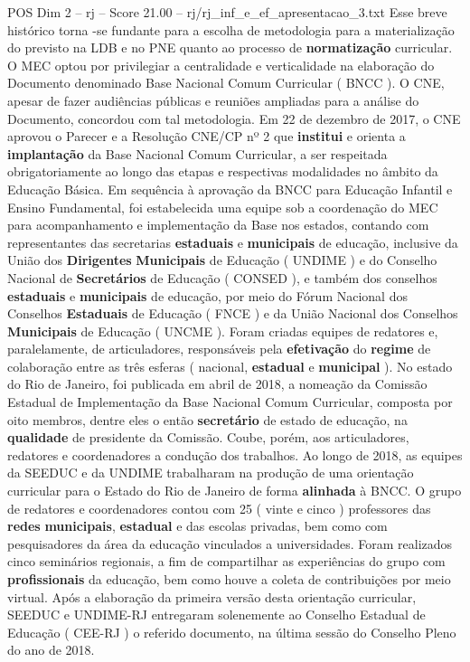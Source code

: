 \begin{textsample}{POS Dim 2 – rj – Score 21.00 – rj/rj\_inf\_e\_ef\_apresentacao\_3.txt}
Esse breve histórico torna -se fundante para a escolha de metodologia para a materialização do previsto na LDB e no PNE quanto ao processo de \textbf{normatização} curricular.
O MEC optou por privilegiar a centralidade e verticalidade na elaboração do Documento denominado Base Nacional Comum Curricular ( BNCC ).
O CNE, apesar de fazer audiências públicas e reuniões ampliadas para a análise do Documento, concordou com tal metodologia.
Em 22 de dezembro de 2017, o CNE aprovou o Parecer e a Resolução CNE/CP nº 2 que \textbf{institui} e orienta a \textbf{implantação} da Base Nacional Comum Curricular, a ser respeitada obrigatoriamente ao longo das etapas e respectivas modalidades no âmbito da Educação Básica.
Em sequência à aprovação da BNCC para Educação Infantil e Ensino Fundamental, foi estabelecida uma equipe sob a coordenação do MEC para acompanhamento e implementação da Base nos estados, contando com representantes das secretarias \textbf{estaduais} e \textbf{municipais} de educação, inclusive da União dos \textbf{Dirigentes} \textbf{Municipais} de Educação ( UNDIME ) e do Conselho Nacional de \textbf{Secretários} de Educação ( CONSED ), e também dos conselhos \textbf{estaduais} e \textbf{municipais} de educação, por meio do Fórum Nacional dos Conselhos \textbf{Estaduais} de Educação ( FNCE ) e da União Nacional dos Conselhos \textbf{Municipais} de Educação ( UNCME ).
Foram criadas equipes de redatores e, paralelamente, de articuladores, responsáveis pela \textbf{efetivação} do \textbf{regime} de colaboração entre as três esferas ( nacional, \textbf{estadual} e \textbf{municipal} ).
No estado do Rio de Janeiro, foi publicada em abril de 2018, a nomeação da Comissão Estadual de Implementação da Base Nacional Comum Curricular, composta por oito membros, dentre eles o então \textbf{secretário} de estado de educação, na \textbf{qualidade} de presidente da Comissão.
Coube, porém, aos articuladores, redatores e coordenadores a condução dos trabalhos.
Ao longo de 2018, as equipes da SEEDUC e da UNDIME trabalharam na produção de uma orientação curricular para o Estado do Rio de Janeiro de forma \textbf{alinhada} à BNCC.
O grupo de redatores e coordenadores contou com 25 ( vinte e cinco ) professores das \textbf{redes} \textbf{municipais}, \textbf{estadual} e das escolas privadas, bem como com pesquisadores da área da educação vinculados a universidades.
Foram realizados cinco seminários regionais, a fim de compartilhar as experiências do grupo com \textbf{profissionais} da educação, bem como houve a coleta de contribuições por meio virtual.
Após a elaboração da primeira versão desta orientação curricular, SEEDUC e UNDIME-RJ entregaram solenemente ao Conselho Estadual de Educação ( CEE-RJ ) o referido documento, na última sessão do Conselho Pleno do ano de 2018.

\end{textsample}
